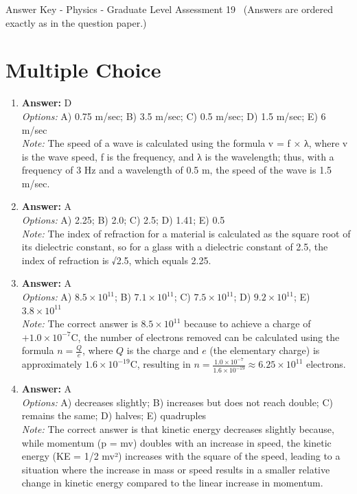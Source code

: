 \documentclass[12pt]{article}
\begin{document}
\begin{center}
Answer Key - Physics - Graduate Level Assessment 19 \
\small (Answers are ordered exactly as in the question paper.)
\end{center}

\section*{Multiple Choice}
\begin{enumerate}[label=\arabic*.]
\item \textbf{Answer:} D
\\ \textit{Options:} A) 0.75 m/sec; B) 3.5 m/sec; C) 0.5 m/sec; D) 1.5 m/sec; E) 6 m/sec
\\ \textit{Note:} The speed of a wave is calculated using the formula v = f × λ, where v is the wave speed, f is the frequency, and λ is the wavelength; thus, with a frequency of 3 Hz and a wavelength of 0.5 m, the speed of the wave is 1.5 m/sec.
\item \textbf{Answer:} A
\\ \textit{Options:} A) 2.25; B) 2.0; C) 2.5; D) 1.41; E) 0.5
\\ \textit{Note:} The index of refraction for a material is calculated as the square root of its dielectric constant, so for a glass with a dielectric constant of 2.5, the index of refraction is √2.5, which equals 2.25.
\item \textbf{Answer:} A
\\ \textit{Options:} A) $8.5 \times 10^{11}$; B) $7.1 \times 10^{11}$; C) $7.5 \times 10^{11}$; D) $9.2 \times 10^{11}$; E) $3.8 \times 10^{11}$
\\ \textit{Note:} The correct answer is $8.5 \times 10^{11}$ because to achieve a charge of $+1.0 \times 10^{-7} \mathrm{C}$, the number of electrons removed can be calculated using the formula \( n = \frac{Q}{e} \), where \( Q \) is the charge and \( e \) (the elementary charge) is approximately \( 1.6 \times 10^{-19} \mathrm{C} \), resulting in \( n = \frac{1.0 \times 10^{-7}}{1.6 \times 10^{-19}} \approx 6.25 \times 10^{11} \) electrons.
\item \textbf{Answer:} A
\\ \textit{Options:} A) decreases slightly; B) increases but does not reach double; C) remains the same; D) halves; E) quadruples
\\ \textit{Note:} The correct answer is that kinetic energy decreases slightly because, while momentum (p = mv) doubles with an increase in speed, the kinetic energy (KE = 1/2 mv²) increases with the square of the speed, leading to a situation where the increase in mass or speed results in a smaller relative change in kinetic energy compared to the linear increase in momentum.

\end{enumerate}
\end{document}

